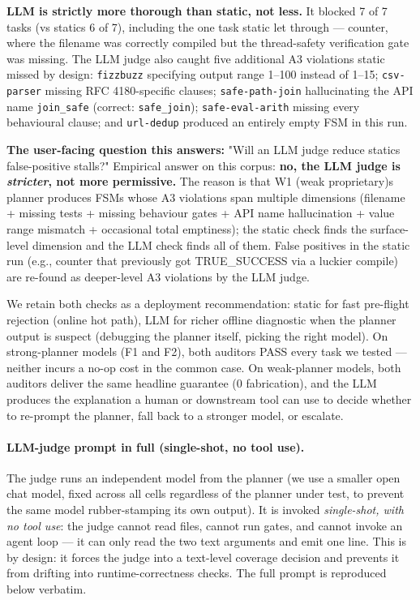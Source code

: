\textbf{LLM is strictly more thorough than static, not less.} It blocked 7 of 7 tasks (vs static\textquotesingle s
6 of 7), including the one task static let through --- counter, where the filename was
correctly compiled but the thread-safety verification gate was missing. The LLM judge also
caught five additional A3 violations static missed by design: \texttt{fizzbuzz} specifying output
range 1--100 instead of 1--15; \texttt{csv-parser} missing RFC 4180-specific clauses; \texttt{safe-path-join}
hallucinating the API name \texttt{join\_safe} (correct: \texttt{safe\_join}); \texttt{safe-eval-arith} missing
every behavioural clause; and \texttt{url-dedup} produced an entirely empty FSM in this run.

\textbf{The user-facing question this answers:} "Will an LLM judge reduce static\textquotesingle s false-positive
stalls?" Empirical answer on this corpus: \textbf{no, the LLM judge is \emph{stricter}, not more
permissive.} The reason is that W1 (weak proprietary)\textquotesingle s planner produces FSMs whose A3 violations
span multiple dimensions (filename + missing tests + missing behaviour gates + API name
hallucination + value range mismatch + occasional total emptiness); the static check finds
the surface-level dimension and the LLM check finds all of them. False positives in the
static run (e.g., counter that previously got TRUE\_SUCCESS via a luckier compile) are
re-found as deeper-level A3 violations by the LLM judge.

We retain both checks as a deployment recommendation: static for fast pre-flight rejection
(online hot path), LLM for richer offline diagnostic when the planner output is suspect
(debugging the planner itself, picking the right model). On strong-planner models (F1
and F2), both auditors PASS every task we tested --- neither incurs a no-op cost in the
common case. On weak-planner models, both auditors deliver the same headline guarantee
(0 fabrication), and the LLM produces the explanation a human or downstream tool can use to
decide whether to re-prompt the planner, fall back to a stronger model, or escalate.



\paragraph{LLM-judge prompt in full (single-shot, no tool use).}
The judge runs an independent model from the planner (we use a smaller open
chat model, fixed across all cells regardless of the planner under test, to
prevent the same model rubber-stamping its own output). It is invoked
\emph{single-shot, with no tool use}: the judge cannot read files, cannot run
gates, and cannot invoke an agent loop --- it can only read the two text
arguments and emit one line. This is by design: it forces the judge into a
text-level coverage decision and prevents it from drifting into
runtime-correctness checks. The full prompt is reproduced below verbatim.

